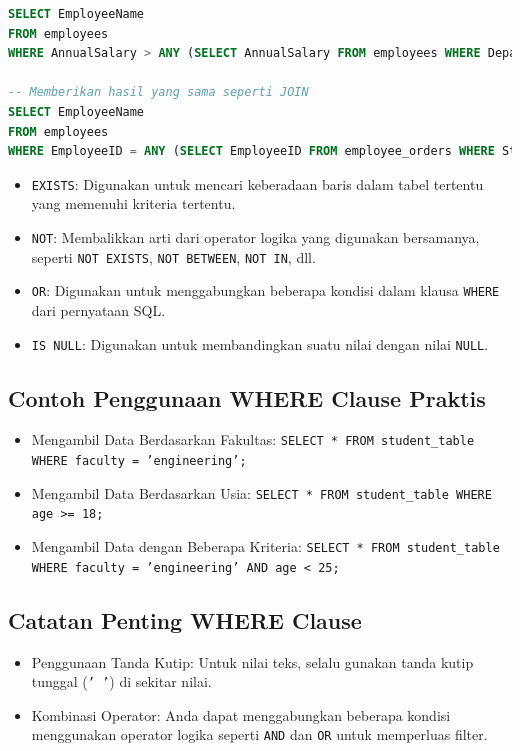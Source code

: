 \documentclass{article}
\begin{document}
\begin{lstlisting}[language=SQL, caption={Contoh Operator ANY}, captionpos=b]
SELECT EmployeeName  
FROM employees  
WHERE AnnualSalary > ANY (SELECT AnnualSalary FROM employees WHERE Department = 'Marketing');

-- Memberikan hasil yang sama seperti JOIN
SELECT EmployeeName  
FROM employees  
WHERE EmployeeID = ANY (SELECT EmployeeID FROM employee_orders WHERE Status = 'Completed');
\end{lstlisting}
\begin{itemize}
    \item \texttt{EXISTS}: Digunakan untuk mencari keberadaan baris dalam tabel tertentu yang memenuhi kriteria tertentu.
    \item \texttt{NOT}: Membalikkan arti dari operator logika yang digunakan bersamanya, seperti \texttt{NOT EXISTS}, \texttt{NOT BETWEEN}, \texttt{NOT IN}, dll.
    \item \texttt{OR}: Digunakan untuk menggabungkan beberapa kondisi dalam klausa \texttt{WHERE} dari pernyataan SQL.
    \item \texttt{IS NULL}: Digunakan untuk membandingkan suatu nilai dengan nilai \texttt{NULL}.
\end{itemize}

\subsection{Contoh Penggunaan WHERE Clause Praktis}
\begin{itemize}
    \item Mengambil Data Berdasarkan Fakultas: \texttt{SELECT * FROM student\_table WHERE faculty = 'engineering';}
    \item Mengambil Data Berdasarkan Usia: \texttt{SELECT * FROM student\_table WHERE age >= 18;}
    \item Mengambil Data dengan Beberapa Kriteria: \texttt{SELECT * FROM student\_table WHERE faculty = 'engineering' AND age < 25;}
\end{itemize}

\subsection{Catatan Penting WHERE Clause}
\begin{itemize}
    \item Penggunaan Tanda Kutip: Untuk nilai teks, selalu gunakan tanda kutip tunggal (\texttt{' '}) di sekitar nilai.
    \item Kombinasi Operator: Anda dapat menggabungkan beberapa kondisi menggunakan operator logika seperti \texttt{AND} dan \texttt{OR} untuk memperluas filter.
\end{itemize}
\end{document}
